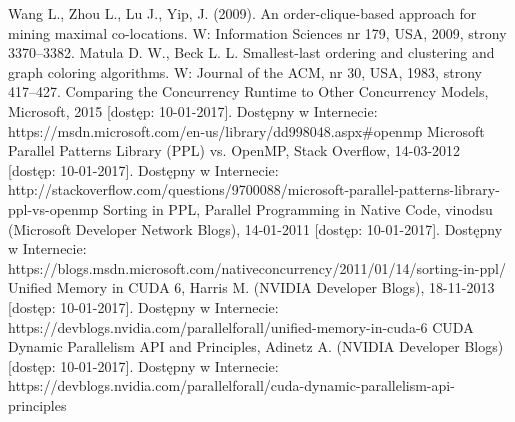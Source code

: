 \documentclass[12pt]{article}
\begin{document}
\begin{thebibliography}{}
Wang L., Zhou L., Lu J., Yip, J. (2009). An order-clique-based approach for mining maximal co-locations. W: Information Sciences nr 179, USA, 2009, strony 3370–3382.
Matula D. W., Beck L. L. Smallest-last ordering and clustering and graph coloring algorithms. W: Journal of the ACM, nr 30, USA, 1983, strony 417–427.
Comparing the Concurrency Runtime to Other Concurrency Models, Microsoft, 2015 [dostęp: 10-01-2017]. Dostępny w Internecie: https://msdn.microsoft.com/en-us/library/dd998048.aspx\#openmp
Microsoft Parallel Patterns Library (PPL) vs. OpenMP, Stack Overflow, 14-03-2012 [dostęp: 10-01-2017]. Dostępny w Internecie: http://stackoverflow.com/questions/9700088/microsoft-parallel-patterns-library-ppl-vs-openmp
Sorting in PPL, Parallel Programming in Native Code, vinodsu (Microsoft Developer Network Blogs), 14-01-2011 [dostęp: 10-01-2017]. Dostępny w Internecie: https://blogs.msdn.microsoft.com/nativeconcurrency/2011/01/14/sorting-in-ppl/
Unified Memory in CUDA 6, Harris M. (NVIDIA Developer Blogs), 18-11-2013 [dostęp: 10-01-2017]. Dostępny w Internecie: https://devblogs.nvidia.com/parallelforall/unified-memory-in-cuda-6
CUDA Dynamic Parallelism API and Principles, Adinetz A. (NVIDIA Developer Blogs) [dostęp: 10-01-2017]. Dostępny w Internecie: https://devblogs.nvidia.com/parallelforall/cuda-dynamic-parallelism-api-principles
\end{thebibliography}
\end{document}

